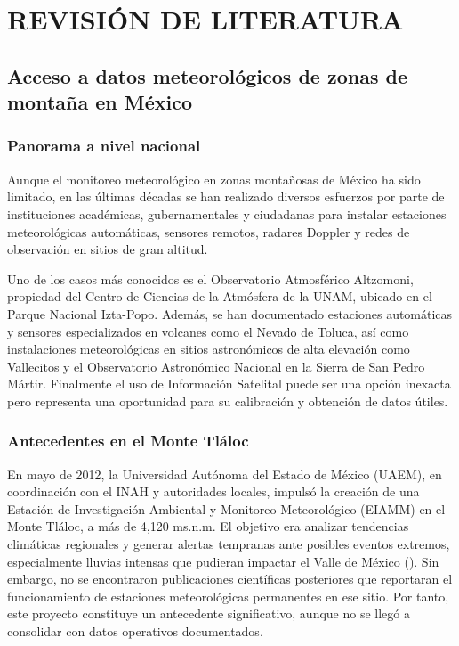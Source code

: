 \chapter{REVISIÓN DE LITERATURA}
\label{cap:3} 
\section{Acceso a datos meteorológicos de zonas de montaña en México}

\subsection{Panorama a nivel nacional}

Aunque el monitoreo meteorológico en zonas montañosas de México ha sido limitado, en las últimas décadas se han realizado diversos esfuerzos por parte de instituciones académicas, gubernamentales y ciudadanas para instalar estaciones meteorológicas automáticas, sensores remotos, radares Doppler y redes de observación en sitios de gran altitud.

Uno de los casos más conocidos es el Observatorio Atmosférico Altzomoni, propiedad del Centro de Ciencias de la Atmósfera de la UNAM, ubicado en el Parque Nacional Izta-Popo. Además, se han documentado estaciones automáticas y sensores especializados en volcanes como el Nevado de Toluca, así como instalaciones meteorológicas en sitios astronómicos de alta elevación como Vallecitos y el Observatorio Astronómico Nacional en la Sierra de San Pedro Mártir. Finalmente el uso de Información Satelital puede ser una opción inexacta pero representa una oportunidad para su calibración y obtención de datos útiles.



\subsection{Antecedentes en el Monte Tláloc}

En mayo de 2012, la Universidad Autónoma del Estado de México (UAEM), en coordinación con el INAH y autoridades locales, impulsó la creación de una Estación de Investigación Ambiental y Monitoreo Meteorológico (EIAMM) en el Monte Tláloc, a más de 4,120  ms.n.m. El objetivo era analizar tendencias climáticas regionales y generar alertas tempranas ante posibles eventos extremos, especialmente lluvias intensas que pudieran impactar el Valle de México (\cite{davila2012}). Sin embargo, no se encontraron publicaciones científicas posteriores que reportaran el funcionamiento de estaciones meteorológicas permanentes en ese sitio. Por tanto, este proyecto constituye un antecedente significativo, aunque no se llegó a consolidar con datos operativos documentados.

